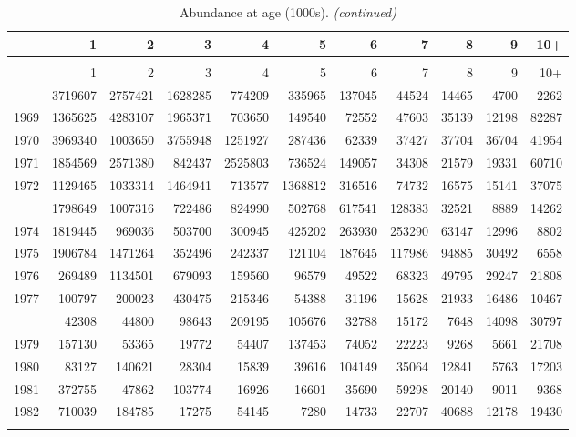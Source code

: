 \documentclass[
]{article}
\begin{document}
\begin{longtable}[t]{lrrrrrrrrrr}
\caption{\label{tab:NAA-table}Abundance at age (1000s).}\\
\toprule
  & 1 & 2 & 3 & 4 & 5 & 6 & 7 & 8 & 9 & 10+\\
\midrule
\endfirsthead
\caption[]{Abundance at age (1000s). \textit{(continued)}}\\
\toprule
  & 1 & 2 & 3 & 4 & 5 & 6 & 7 & 8 & 9 & 10+\\
\midrule
\endhead

\endfoot
\bottomrule
\endlastfoot
1968 & 3719607 & 2757421 & 1628285 & 774209 & 335965 & 137045 & 44524 & 14465 & 4700 & 2262\\
1969 & 1365625 & 4283107 & 1965371 & 703650 & 149540 & 72552 & 47603 & 35139 & 12198 & 82287\\
1970 & 3969340 & 1003650 & 3755948 & 1251927 & 287436 & 62339 & 37427 & 37704 & 36704 & 41954\\
1971 & 1854569 & 2571380 & 842437 & 2525803 & 736524 & 149057 & 34308 & 21579 & 19331 & 60710\\
1972 & 1129465 & 1033314 & 1464941 & 713577 & 1368812 & 316516 & 74732 & 16575 & 15141 & 37075\\
\addlinespace
1973 & 1798649 & 1007316 & 722486 & 824990 & 502768 & 617541 & 128383 & 32521 & 8889 & 14262\\
1974 & 1819445 & 969036 & 503700 & 300945 & 425202 & 263930 & 253290 & 63147 & 12996 & 8802\\
1975 & 1906784 & 1471264 & 352496 & 242337 & 121104 & 187645 & 117986 & 94885 & 30492 & 6558\\
1976 & 269489 & 1134501 & 679093 & 159560 & 96579 & 49522 & 68323 & 49795 & 29247 & 21808\\
1977 & 100797 & 200023 & 430475 & 215346 & 54388 & 31196 & 15628 & 21933 & 16486 & 10467\\
\addlinespace
1978 & 42308 & 44800 & 98643 & 209195 & 105676 & 32788 & 15172 & 7648 & 14098 & 30797\\
1979 & 157130 & 53365 & 19772 & 54407 & 137453 & 74052 & 22223 & 9268 & 5661 & 21708\\
1980 & 83127 & 140621 & 28304 & 15839 & 39616 & 104149 & 35064 & 12841 & 5763 & 17203\\
1981 & 372755 & 47862 & 103774 & 16926 & 16601 & 35690 & 59298 & 20140 & 9011 & 9368\\
1982 & 710039 & 184785 & 17275 & 54145 & 7280 & 14733 & 22707 & 40688 & 12178 & 19430\\
\addlinespace

\end{longtable}
\end{document}
